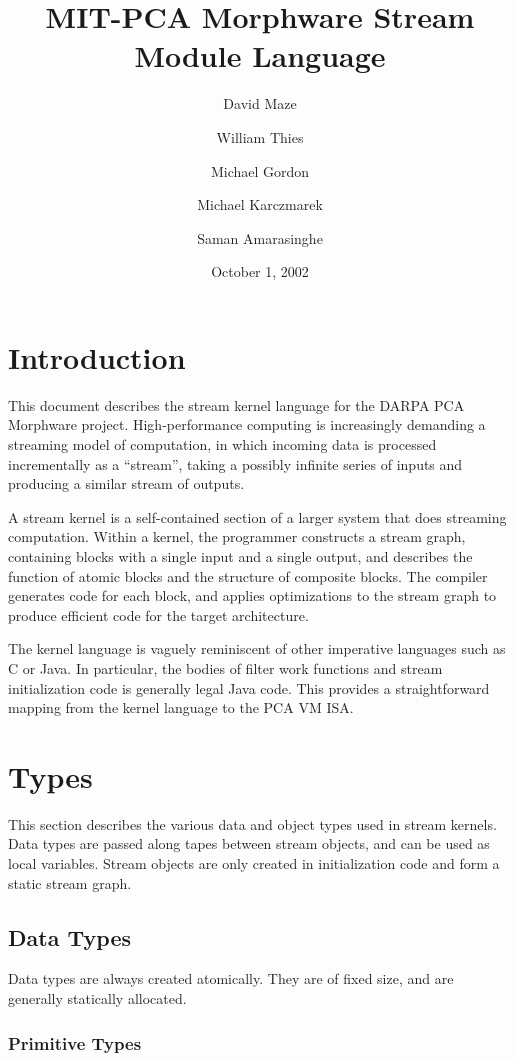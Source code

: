 \documentclass[11pt]{article}
\title{MIT-PCA Morphware Stream Module Language}
\author{David Maze \and William Thies \and Michael Gordon \and Michael
  Karczmarek \and Saman Amarasinghe}
\date{October 1, 2002}
\begin{document}
\maketitle
\tableofcontents

\section{Introduction}

This document describes the stream kernel language for the DARPA PCA
Morphware project.  High-performance computing is increasingly
demanding a streaming model of computation, in which incoming data is
processed incrementally as a ``stream'', taking a possibly infinite
series of inputs and producing a similar stream of outputs.

A stream kernel is a self-contained section of a larger system that
does streaming computation.  Within a kernel, the programmer
constructs a stream graph, containing blocks with a single input and a
single output, and describes the function of atomic blocks and the
structure of composite blocks.  The compiler generates code for each
block, and applies optimizations to the stream graph to produce
efficient code for the target architecture.

The kernel language is vaguely reminiscent of other imperative
languages such as C or Java.  In particular, the bodies of filter work
functions and stream initialization code is generally legal Java
code.  This provides a straightforward mapping from the kernel
language to the PCA VM ISA.

\section{Types}

This section describes the various data and object types used in
stream kernels.  Data types are passed along tapes between stream
objects, and can be used as local variables.  Stream objects are only
created in initialization code and form a static stream graph.

\subsection{Data Types}

Data types are always created atomically.  They are of fixed size, and
are generally statically allocated.

\subsubsection{Primitive Types}
\end{document}
